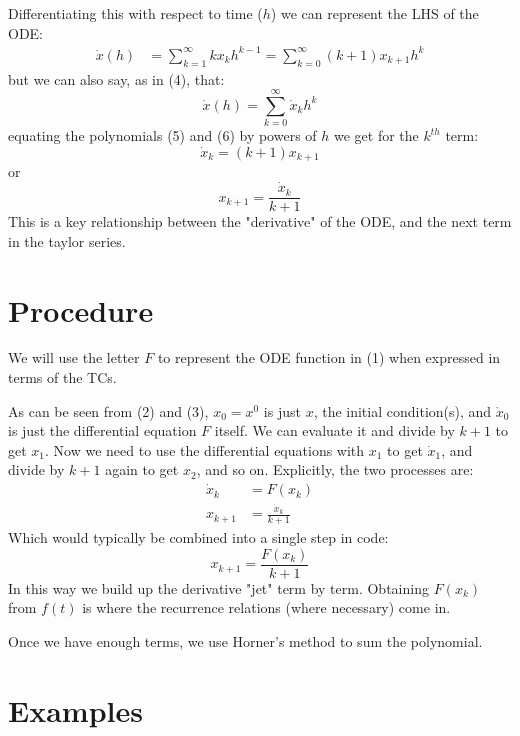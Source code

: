 \documentclass[11pt]{article}
\begin{document}
Differentiating this with respect to time ($h$) we can represent the LHS of the ODE:
\begin{equation}
\begin{aligned}
\dot{x}(h) &= \sum_{k=1}^{\infty} k x_kh^{k-1} = \sum_{k=0}^{\infty} (k + 1) x_{k+1}h^k
\end{aligned}
\end{equation}
but we can also say, as in (4), that:
\begin{equation}
\dot{x}(h) = \sum_{k=0}^{\infty} \dot{x}_kh^k
\end{equation}
equating the polynomials (5) and (6) by powers of $h$ we get for the $k^{th}$ term:
\begin{equation}
\dot{x}_k = (k + 1) x_{k+1}
\end{equation}
or
\begin{equation}
x_{k+1} = \frac{\dot{x}_k} {k + 1} 
\end{equation}
This is a key relationship between the "derivative" of the ODE, and the next term in the taylor series.
\section{Procedure}
We will use the letter $F$ to represent the ODE function in (1) when expressed in terms of the TCs.

As can be seen from (2) and (3), $x_0 = x^0$ is just $x$, the initial condition(s), and $\dot{x}_0$ is just the differential equation $F$ itself.
We can evaluate it and divide by $k + 1$ to get $x_1$.
Now we need to use the differential equations with $x_1$ to get $\dot{x}_1$, and divide by $k + 1$ again to get $x_2$, and so on.  Explicitly, the two processes are:
\begin{equation}
\begin{aligned}
\dot{x}_k &= F(x_k) \\
x_{k+1} &= \frac{\dot{x}_k} {k + 1}
\end{aligned}
\end{equation}
Which would typically be combined into a single step in code:
\begin{equation}
x_{k+1} = \frac{F(x_k)} {k + 1}
\end{equation}
In this way we build up the derivative "jet" term by term.
Obtaining $F(x_k)$ from $f(t)$ is where the recurrence relations (where necessary) come in.

Once we have enough terms, we use Horner's method to sum the polynomial.
\section{Examples}
\end{document}
